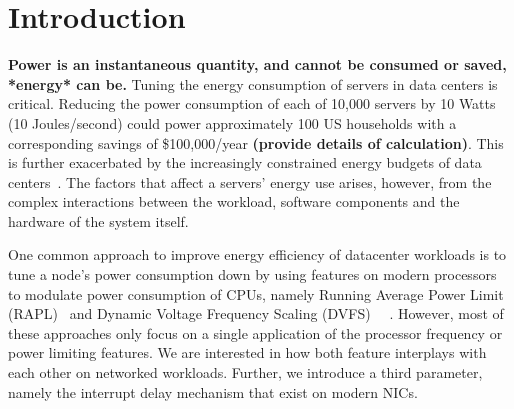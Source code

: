 \section{Introduction}
\textbf{Power is an instantaneous quantity, and cannot be consumed or saved, *energy* can be.}
Tuning the energy consumption of servers in data centers is critical. Reducing the power consumption of each of 10,000 servers by 10 Watts (10 Joules/second) could power approximately 100 US households with a corresponding savings of \$100,000/year \textbf{(provide details of calculation)}. This is further exacerbated by the increasingly constrained energy budgets of data centers~\cite{SmoothOperator, Dynamo}. The factors that affect a servers' energy use arises, however, from the complex interactions between the workload, software components and the hardware of the system itself. 

\indent One common approach to improve energy efficiency of datacenter workloads is to tune a node's power consumption down by using features on modern processors to modulate power consumption of CPUs, namely Running Average Power Limit (RAPL)~\cite{intel_rapl} and Dynamic Voltage Frequency Scaling (DVFS) ~\cite{cpufreq_governor}~\cite{10.1145/2678373.2665718, 10.1145/2806777.2806848}. However, most of these approaches only focus on a single application of the processor frequency or power limiting features. We are interested in how both feature interplays with each other on networked workloads. Further, we introduce a third parameter, namely the interrupt delay mechanism that exist on modern NICs.





